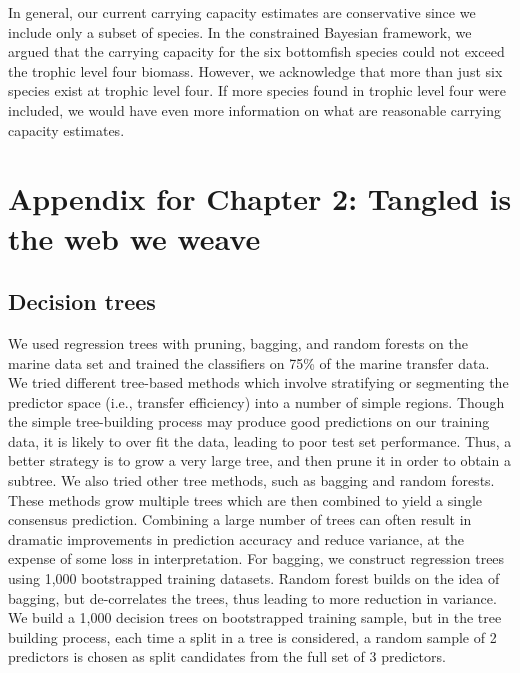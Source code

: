 \documentclass[oneside,12pt,final]{sty/ucthesis-CA2012}
\begin{document}
\begin{mainmatter}
\vspace{5mm}

In general, our current carrying capacity estimates are conservative since we include only a subset of species. In the constrained Bayesian framework, we argued that the carrying capacity for the six bottomfish species could not exceed the trophic level four biomass. However, we acknowledge that more than just six species exist at trophic level four. If more species found in trophic level four were included, we would have even more information on what are reasonable carrying capacity estimates. 





\appendix

\dsp

\chapter{Appendix for Chapter 2: Tangled is the web we weave}{\label{appendix:a}}

\section{Decision trees}
We used regression trees with pruning, bagging, and random forests on the marine data set and trained the classifiers on 75\% of the marine transfer data. We tried different tree-based methods which involve stratifying or segmenting the predictor space (i.e., transfer efficiency) into a number of simple regions. Though the simple tree-building process may produce good predictions on our training data, it is likely to over fit the data, leading to poor test set performance. Thus, a better strategy is to grow a very large tree, and then prune it in order to obtain a subtree. We also tried other tree methods, such as bagging and random forests. These methods grow multiple trees which are then combined to yield a single consensus prediction. Combining a large number of trees can often result in dramatic improvements in prediction accuracy and reduce variance, at the expense of some loss in interpretation. For bagging, we construct regression trees using 1,000 bootstrapped training datasets. Random forest builds on the idea of bagging, but de-correlates the trees, thus leading to more reduction in variance. We build a 1,000 decision trees on bootstrapped training sample, but in the tree building process, each time a split in a tree is considered, a random sample of 2 predictors is chosen as split candidates from the full set of 3 predictors.


\end{mainmatter}
\end{document}
